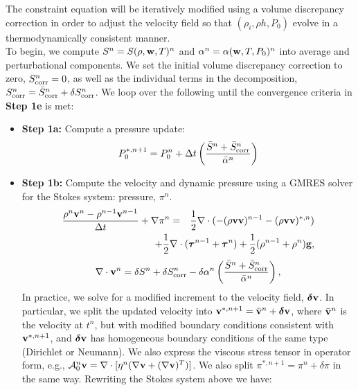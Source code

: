 \documentclass[final]{siamltex}
\def\gb {{\bf g}}
\def\vb {{\bf v}}
\def\wb {{\bf w}}
\def\deltab {\boldsymbol{\delta}}
\def\taub   {\boldsymbol{\tau}}
\def\half   {\frac{1}{2}}
\begin{document}
The constraint equation will be iteratively modified using a volume discrepancy
correction in order to adjust the velocity field
so that $(\rho_i,\rho h,P_0)$ evolve in a thermodynamically consistent manner.\\

To begin, we compute $S^n = S(\rho,\wb,T)^n$ and $\alpha^n = \alpha(\wb,T,P_0)^n$
into average and perturbational components.
We set the initial volume discrepancy correction to zero, 
$S_{\rm corr}^n = 0$, as well as the individual terms in the decomposition,
$S_{\rm corr}^n = \bar{S}_{\rm corr}^n + \delta S_{\rm corr}^n$.
We loop over the following until the convergence criteria in {\bf Step 1e} is met:\\
\begin{itemize}
\item {\bf Step 1a:} Compute a pressure update:
\begin{equation}
P_0^{*,n+1} = P_0^n + \Delta t\left(\frac{\bar{S}^n + \bar{S}_{\rm corr}^n}{\bar{\alpha}^n}\right)
\end{equation}
\item {\bf Step 1b:} Compute the velocity and dynamic pressure using a GMRES solver for the Stokes system:
pressure, $\pi^n$.
\begin{eqnarray}
\frac{\rho^n\vb^n - \rho^{n-1}\vb^{n-1}}{\Delta t} + \nabla\pi^n &=& \half\nabla\cdot(-(\rho\vb\vb)^{n-1} - (\rho\vb\vb)^{*,n})\nonumber\\
&&\hspace{-0.5in} + \frac{1}{2}\nabla\cdot(\taub^{n-1} + \taub^n) + \frac{1}{2}(\rho^{n-1} + \rho^n)\gb,
\end{eqnarray}
\begin{equation}
\nabla\cdot\vb^n = \delta S^n + \delta S_{\rm corr}^n - \delta\alpha^n\left(\frac{\bar{S}^n + \bar{S}_{\rm corr}^n}{\bar{\alpha}^n}\right),
\end{equation}
In practice, we solve for a modified increment to the velocity field, $\deltab\vb$.  In particular,
we split the updated velocity into
$\vb^{*,n+1} = \bar{\vb}^n + \deltab\vb$, where $\bar{\vb}^n$ is the velocity at $t^n$, but with modified boundary
conditions consistent with $\vb^{*,n+1}$, and $\deltab\vb$ has homogeneous boundary conditions of the same type (Dirichlet or Neumann).
We also express the viscous stress tensor in operator form, e.g., 
$\mathcal{A}_0^n\vb = \nabla\cdot[\eta^n(\nabla\vb + (\nabla\vb)^T)]$.  
We also split $\pi^{*,n+1} = \pi^n + \delta\pi$ in the same way.  Rewriting the Stokes system above we have:
\begin{eqnarray}

\end{eqnarray}
\end{itemize}
\end{document}
